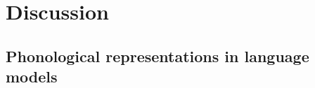 \chapter{Discussion}\label{chapter:discussion}

\section{Phonological representations in language models}
\label{sec:14-audiomodels}







